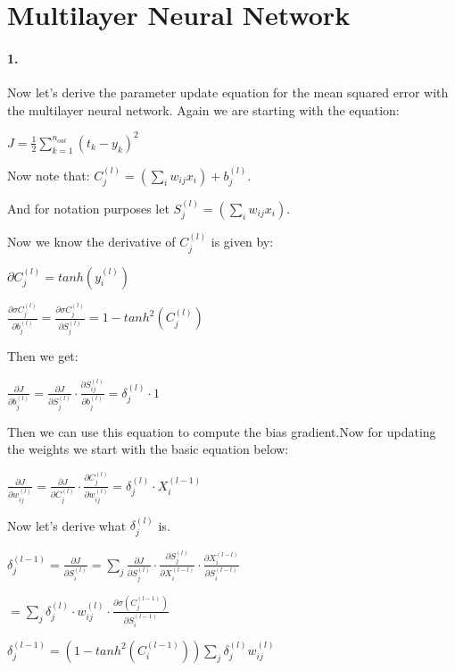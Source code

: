 \documentclass[12pt]{article}
\begin{document}
\newpage
\section*{Multilayer Neural Network}

\paragraph{1.}

Now let's derive the parameter update equation for the mean squared error with the multilayer neural network. Again we are starting with the equation:

$J = \frac{1}{2}\sum\limits_{k=1}^{n_{out}} (t_k - y_k)^2
$

Now note that: $C_j^{(l)} = (\sum \limits_i w_{ij}x_i) + b_j^{(l)}
$.

And for notation purposes let $S_j^{(l)} = (\sum \limits_i w_{ij}x_i)$.

Now we know the derivative of $C_j^{(l)}$ is given by:

$\partial C_j^{(l)} = tanh(y_i^{(l)})$

$\frac{\partial \sigma C_j^{(l)}}{\partial b_j^{(l)}}
= \frac{\partial \sigma C_j^{(l)}}{\partial S_j^{(l)}}
= 1 - tanh^2(C_j^{(l)})
$

Then we get:

$\frac{\partial J}{\partial b_j^{(l)}} = 
\frac{\partial J}{\partial S_j^(l)} \cdot \frac{\partial S_{ij}^{(l)}}{\partial b_j^{(l)}}
= \delta_j^{(l)} \cdot 1
$

Then we can use this equation to compute the bias gradient.Now for updating the weights we start with the basic equation below:

$\frac{\partial J}{\partial w_{ij}^{(l)}} =
\frac{\partial J}{\partial C_j^{(l)}} \cdot \frac{\partial C_j^{(l)}}{\partial w_{ij}^{(l)}}
= \delta_j^{(l)} \cdot X_i^{(l-1)}
$

Now let's derive what $\delta_j^{(l)}$ is.

$\delta_j^{(l-1)} = \frac{\partial J}{\partial S_i^{(l)}} =
\sum \limits_j \frac{\partial J}{\partial S_j^{(l)}} \cdot
\frac{\partial S_j^{(l)}}{\partial X_i^{(l-l)}} \cdot
\frac{\partial X_i^{(l-l)}}{\partial S_i^{(l-l)}}
$

$= \sum \limits_j \delta_j^{(l)} \cdot w_{ij}^{(l)} \cdot
\frac{\partial \sigma(C_j^{(l-1)})}{\partial S_i^{(l-1)}}
$

$\delta_j^{(l-1)} = (1 - tanh^2(C_i^{(l-1)}))\sum \limits_j
\delta_j^{(l)}w_{ij}^{(l)}
$
\end{document}
